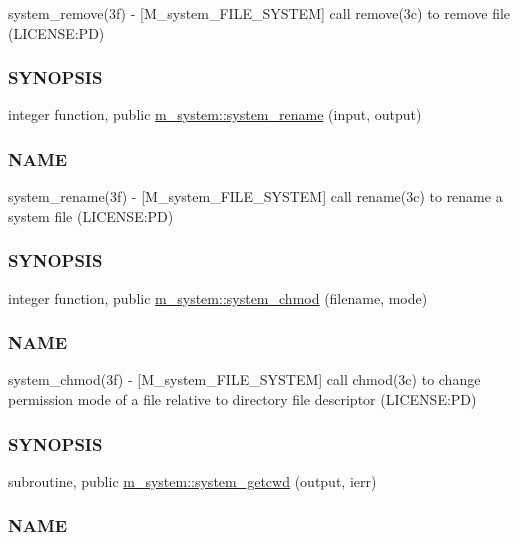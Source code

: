 \begin{DoxyCompactItemize}
\begin{DoxyCompactList}
system\+\_\+remove(3f) -\/ \mbox{[}M\+\_\+system\+\_\+\+F\+I\+L\+E\+\_\+\+S\+Y\+S\+T\+EM\mbox{]} call remove(3c) to remove file (L\+I\+C\+E\+N\+SE\+:PD) \subsubsection*{S\+Y\+N\+O\+P\+S\+IS}\end{DoxyCompactList}\item 
integer function, public \mbox{\hyperlink{namespacem__system_adfbaf3d17790da9ba0c520683d5b8003}{m\+\_\+system\+::system\+\_\+rename}} (input, output)
\begin{DoxyCompactList}\small\item\em \subsubsection*{N\+A\+ME}

system\+\_\+rename(3f) -\/ \mbox{[}M\+\_\+system\+\_\+\+F\+I\+L\+E\+\_\+\+S\+Y\+S\+T\+EM\mbox{]} call rename(3c) to rename a system file (L\+I\+C\+E\+N\+SE\+:PD) \subsubsection*{S\+Y\+N\+O\+P\+S\+IS}\end{DoxyCompactList}\item 
integer function, public \mbox{\hyperlink{namespacem__system_ace9ce0c8a9c8341a76b8903cd2390ce3}{m\+\_\+system\+::system\+\_\+chmod}} (filename, mode)
\begin{DoxyCompactList}\small\item\em \subsubsection*{N\+A\+ME}

system\+\_\+chmod(3f) -\/ \mbox{[}M\+\_\+system\+\_\+\+F\+I\+L\+E\+\_\+\+S\+Y\+S\+T\+EM\mbox{]} call chmod(3c) to change permission mode of a file relative to directory file descriptor (L\+I\+C\+E\+N\+SE\+:PD) \subsubsection*{S\+Y\+N\+O\+P\+S\+IS}\end{DoxyCompactList}\item 
subroutine, public \mbox{\hyperlink{namespacem__system_a5a32db818a9ffb0a4ea724e95356c560}{m\+\_\+system\+::system\+\_\+getcwd}} (output, ierr)
\begin{DoxyCompactList}\small\item\em \subsubsection*{N\+A\+ME}


\end{DoxyCompactList}
\end{DoxyCompactItemize}
